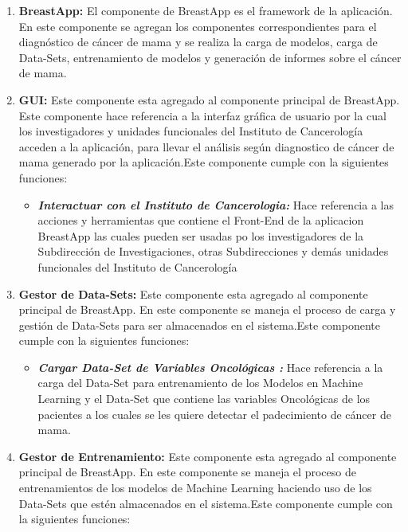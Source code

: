 \begin{enumerate}[label=\textbf{\arabic*})]
	
\item  \textbf{BreastApp:} El componente de BreastApp es el framework  de la aplicación. En este componente se agregan los componentes correspondientes para el diagnóstico de cáncer de mama y se realiza la carga de modelos, carga de Data-Sets, entrenamiento de modelos  y generación de informes  sobre el cáncer de mama.

\item  \textbf{GUI:} Este componente esta agregado al componente principal de BreastApp. Este componente hace referencia a la interfaz gráfica de usuario por la cual los investigadores y unidades funcionales del Instituto  de Cancerología acceden a la aplicación, para llevar el análisis según diagnostico de cáncer de mama generado por la aplicación.Este componente cumple con la siguientes funciones:

	
\begin{itemize}
	\item  \textbf{\textit{Interactuar con el Instituto de Cancerologia:}} Hace referencia a las acciones y herramientas que contiene el Front-End de la aplicacion BreastApp las cuales pueden ser usadas po los investigadores de la Subdirección de Investigaciones, otras Subdirecciones y demás unidades funcionales del Instituto de Cancerología 
\end{itemize}
	
\item  \textbf{Gestor de Data-Sets:} Este componente esta agregado al componente principal de BreastApp. En este componente se maneja el proceso de carga  y gestión de Data-Sets para ser almacenados en el sistema.Este componente cumple con la siguientes funciones:
	
	\begin{itemize}
		\item  \textbf{\textit{Cargar Data-Set de Variables Oncológicas :}} Hace referencia a la carga del Data-Set para entrenamiento de los Modelos en Machine Learning y el Data-Set que contiene las variables Oncológicas de los pacientes a los cuales se les quiere detectar el padecimiento de cáncer de mama.
	\end{itemize}

\item  \textbf{Gestor de Entrenamiento:} Este componente esta agregado al componente principal de BreastApp. En este componente se maneja el proceso de entrenamientos de los modelos de Machine Learning haciendo uso de los Data-Sets  que estén almacenados en el sistema.Este componente cumple con la siguientes funciones:


\end{enumerate}
